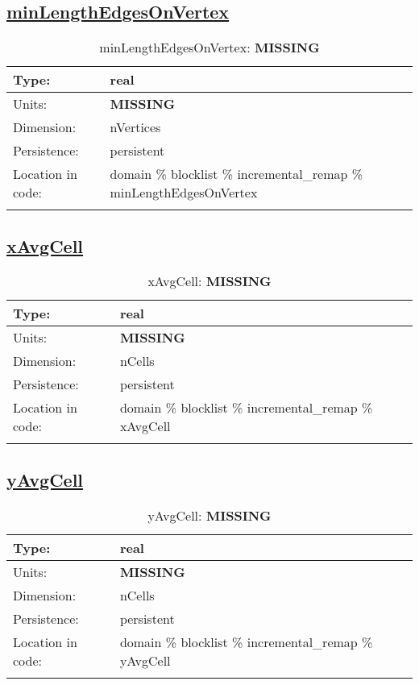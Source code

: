\subsection[minLengthEdgesOnVertex]{\hyperref[sec:var_tab_incremental_remap]{minLengthEdgesOnVertex}}
\label{subsec:var_sec_incremental_remap_minLengthEdgesOnVertex}
\begin{center}
\begin{longtable}{| p{2.0in} | p{4.0in} |}
        \hline 
        Type: & real \\
        \hline 
        Units: & {\bf \color{red} MISSING} \\
        \hline 
        Dimension: & nVertices \\
        \hline 
        Persistence: & persistent \\
        \hline 
         Location in code: & domain \% blocklist \% incremental\_remap \% minLengthEdgesOnVertex \\
         \hline 
    \caption{minLengthEdgesOnVertex: {\bf \color{red} MISSING}}
\end{longtable}
\end{center}
\subsection[xAvgCell]{\hyperref[sec:var_tab_incremental_remap]{xAvgCell}}
\label{subsec:var_sec_incremental_remap_xAvgCell}
\begin{center}
\begin{longtable}{| p{2.0in} | p{4.0in} |}
        \hline 
        Type: & real \\
        \hline 
        Units: & {\bf \color{red} MISSING} \\
        \hline 
        Dimension: & nCells \\
        \hline 
        Persistence: & persistent \\
        \hline 
         Location in code: & domain \% blocklist \% incremental\_remap \% xAvgCell \\
         \hline 
    \caption{xAvgCell: {\bf \color{red} MISSING}}
\end{longtable}
\end{center}
\subsection[yAvgCell]{\hyperref[sec:var_tab_incremental_remap]{yAvgCell}}
\label{subsec:var_sec_incremental_remap_yAvgCell}
\begin{center}
\begin{longtable}{| p{2.0in} | p{4.0in} |}
        \hline 
        Type: & real \\
        \hline 
        Units: & {\bf \color{red} MISSING} \\
        \hline 
        Dimension: & nCells \\
        \hline 
        Persistence: & persistent \\
        \hline 
         Location in code: & domain \% blocklist \% incremental\_remap \% yAvgCell \\
         \hline 
    \caption{yAvgCell: {\bf \color{red} MISSING}}
\end{longtable}
\end{center}
